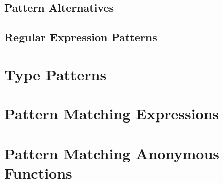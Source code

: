 \subsection{Pattern Alternatives}

\subsection{Regular Expression Patterns}

\section{Type Patterns}

\section{Pattern Matching Expressions}

\section{Pattern Matching Anonymous Functions}



